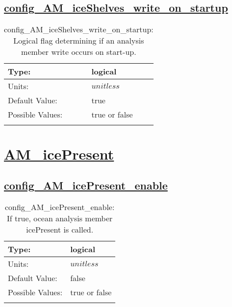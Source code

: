 \subsection[config\_AM\_iceShelves\_write\_on\_startup]{\hyperref[sec:nm_tab_AM_iceShelves]{config\_AM\_iceShelves\_write\_on\_startup}}
\label{subsec:nm_sec_config_AM_iceShelves_write_on_startup}
\begin{center}
\begin{longtable}{| p{2.0in} || p{4.0in} |}
    \hline
    Type: & logical \\
    \hline
    Units: & $unitless$ \\
    \hline
    Default Value: & true \\
    \hline
    Possible Values: & true or false \\
    \hline
    \caption{config\_AM\_iceShelves\_write\_on\_startup: Logical flag determining if an analysis member write occurs on start-up.}
\end{longtable}
\end{center}
\section[AM\_icePresent]{\hyperref[sec:nm_tab_AM_icePresent]{AM\_icePresent}}
\label{sec:nm_sec_AM_icePresent}
\subsection[config\_AM\_icePresent\_enable]{\hyperref[sec:nm_tab_AM_icePresent]{config\_AM\_icePresent\_enable}}
\label{subsec:nm_sec_config_AM_icePresent_enable}
\begin{center}
\begin{longtable}{| p{2.0in} || p{4.0in} |}
    \hline
    Type: & logical \\
    \hline
    Units: & $unitless$ \\
    \hline
    Default Value: & false \\
    \hline
    Possible Values: & true or false \\
    \hline
    \caption{config\_AM\_icePresent\_enable: If true, ocean analysis member icePresent is called.}
\end{longtable}
\end{center}
